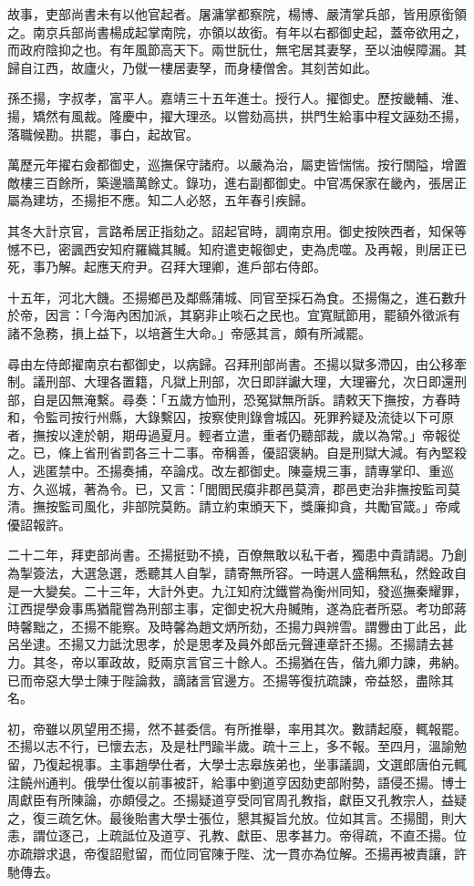 \begin{pinyinscope}
故事，吏部尚書未有以他官起者。屠滽掌都察院，楊博、嚴清掌兵部，皆用原銜領之。南京兵部尚書楊成起掌南院，亦領以故銜。有年以右都御史起，蓋帝欲用之，而政府陰抑之也。有年風節高天下。兩世朊仕，無宅居其妻孥，至以油幙障漏。其歸自江西，故廬火，乃僦一樓居妻孥，而身棲僧舍。其刻苦如此。

孫丕揚，字叔孝，富平人。嘉靖三十五年進士。授行人。擢御史。歷按畿輔、淮、揚，矯然有風裁。隆慶中，擢大理丞。以嘗劾高拱，拱門生給事中程文誣劾丕揚，落職候勘。拱罷，事白，起故官。

萬歷元年擢右僉都御史，巡撫保守諸府。以嚴為治，屬吏皆惴惴。按行關隘，增置敵樓三百餘所，築邊牆萬餘丈。錄功，進右副都御史。中官馮保家在畿內，張居正屬為建坊，丕揚拒不應。知二人必怒，五年春引疾歸。

其冬大計京官，言路希居正指劾之。詔起官時，調南京用。御史按陜西者，知保等憾不已，密諷西安知府羅織其贓。知府遣吏報御史，吏為虎噬。及再報，則居正已死，事乃解。起應天府尹。召拜大理卿，進戶部右侍郎。

十五年，河北大饑。丕揚鄉邑及鄰縣蒲城、同官至採石為食。丕揚傷之，進石數升於帝，因言：「今海內困加派，其窮非止啖石之民也。宜寬賦節用，罷額外徵派有諸不急務，損上益下，以培蒼生大命。」帝感其言，頗有所減罷。

尋由左侍郎擢南京右都御史，以病歸。召拜刑部尚書。丕揚以獄多滯囚，由公移牽制。議刑部、大理各置籍，凡獄上刑部，次日即詳讞大理，大理審允，次日即還刑部，自是囚無淹繫。尋奏：「五歲方恤刑，恐冤獄無所訴。請敕天下撫按，方春時和，令監司按行州縣，大錄繫囚，按察使則錄會城囚。死罪矜疑及流徒以下可原者，撫按以達於朝，期毋過夏月。輕者立遣，重者仍聽部裁，歲以為常。」帝報從之。已，條上省刑省罰各三十二事。帝稱善，優詔褒納。自是刑獄大減。有內堅殺人，逃匿禁中。丕揚奏捕，卒論戍。改左都御史。陳臺規三事，請專掌印、重巡方、久巡城，著為令。已，又言：「閭閻民瘼非郡邑莫濟，郡邑吏治非撫按監司莫清。撫按監司風化，非部院莫飭。請立約束頒天下，獎廉抑貪，共勵官箴。」帝咸優詔報許。

二十二年，拜吏部尚書。丕揚挺勁不撓，百僚無敢以私干者，獨患中貴請謁。乃創為掣簽法，大選急選，悉聽其人自掣，請寄無所容。一時選人盛稱無私，然銓政自是一大變矣。二十三年，大計外吏。九江知府沈鐵嘗為衡州同知，發巡撫秦耀罪，江西提學僉事馬猶龍嘗為刑部主事，定御史祝大舟贓賄，遂為庇者所惡。考功郎蔣時馨黜之，丕揚不能察。及時馨為趙文炳所劾，丕揚力與辨雪。謂釁由丁此呂，此呂坐逮。丕揚又力詆沈思孝，於是思孝及員外郎岳元聲連章訐丕揚。丕揚請去甚力。其冬，帝以軍政故，貶兩京言官三十餘人。丕揚猶在告，偕九卿力諫，弗納。已而帝惡大學士陳于陛論救，謫諸言官邊方。丕揚等復抗疏諫，帝益怒，盡除其名。

初，帝雖以夙望用丕揚，然不甚委信。有所推舉，率用其次。數請起廢，輒報罷。丕揚以志不行，已懷去志，及是杜門踰半歲。疏十三上，多不報。至四月，溫諭勉留，乃復起視事。主事趙學仕者，大學士志皋族弟也，坐事議調，文選郎唐伯元輒注饒州通判。俄學仕復以前事被訐，給事中劉道亨因劾吏部附勢，語侵丕揚。博士周獻臣有所陳論，亦頗侵之。丕揚疑道亨受同官周孔教指，獻臣又孔教宗人，益疑之，復三疏乞休。最後貽書大學士張位，懇其擬旨允放。位如其言。丕揚聞，則大恚，謂位逐己，上疏詆位及道亨、孔教、獻臣、思孝甚力。帝得疏，不直丕揚。位亦疏辯求退，帝復詔慰留，而位同官陳于陛、沈一貫亦為位解。丕揚再被責讓，許馳傳去。


\end{pinyinscope}
